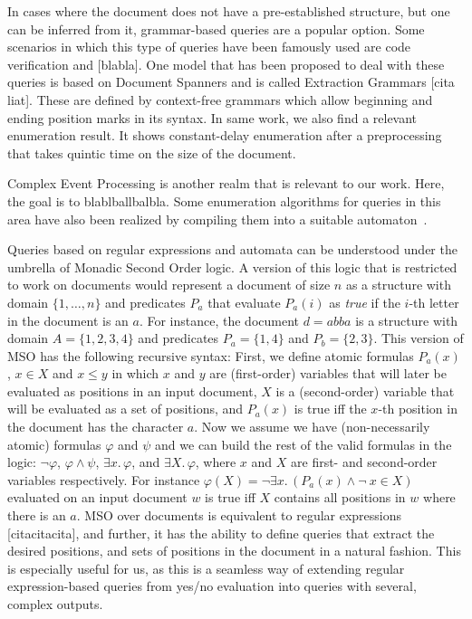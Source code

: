 In cases where the document does not have a pre-established structure, but one can be inferred from it, grammar-based queries are a popular option. Some scenarios in which this type of queries have been famously used are code verification and [blabla]. One model that has been proposed to deal with these queries is based on Document Spanners and is called Extraction Grammars [cita liat]. These are defined by context-free grammars which allow beginning and ending position marks in its syntax. 
In same work, we also find a relevant enumeration result. It shows constant-delay enumeration after a preprocessing that takes quintic time on the size of the document.

Complex Event Processing is another realm that is relevant to our work. Here, the goal is to blablballbalbla. Some enumeration algorithms for queries in this area have also been realized by compiling them into a suitable automaton~\cite{GrezRU19,GrezR20,BucchiGQRV22}.


Queries based on regular expressions and automata can be understood under the umbrella of Monadic Second Order logic. 
A version of this logic that is restricted to work on documents would represent a document of size $n$ as a structure with domain $\{1,\ldots, n\}$ and predicates $P_a$ that evaluate $P_a(i)$ as {\it true} if the $i$-th letter in the document is an $a$. For instance, the document $d = abba$ is a structure with domain $A = \{1,2,3,4\}$ and predicates $P_a = \{1, 4\}$ and $P_b = \{2, 3\}$. This version of MSO has the following recursive syntax: First, we define atomic formulas $P_a(x)$, $x\in X$ and $x\leq y$ in which $x$ and $y$ are (first-order) variables that will later be evaluated as positions in an input document, $X$ is a (second-order) variable that will be evaluated as a set of positions, and $P_a(x)$ is true iff the $x$-th position in the document has the character $a$. 
Now we assume we have (non-necessarily atomic) formulas $\varphi$ and $\psi$ and we can build the rest of the valid formulas in the logic: $\neg \varphi$, $\varphi \wedge \psi$, $\exists x .\, \varphi$, and $\exists X.\, \varphi$, where $x$ and $X$ are first- and second-order variables respectively. For instance $\varphi(X) = \neg\exists x.\,(P_a(x)\wedge \neg\  x\!\in\! X)$ evaluated on an input document $w$ is true iff $X$ contains all positions in $w$ where there is an $a$.
MSO over documents is equivalent to regular expressions [citacitacita], and further, it has the ability to define queries that extract the desired positions, and sets of positions in the document in a natural fashion. This is especially useful for us, as this is a seamless way of extending regular expression-based queries from yes/no evaluation into queries with several, complex outputs.

